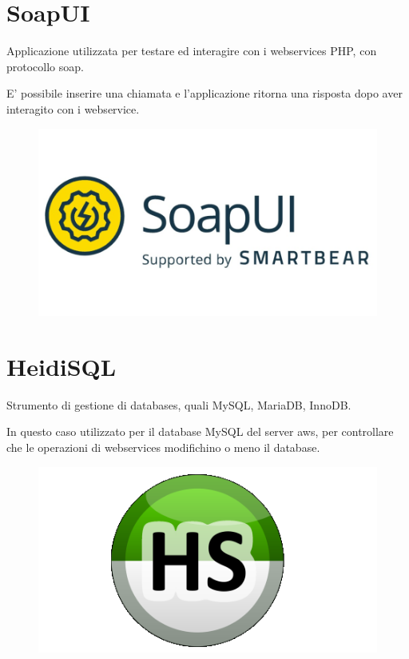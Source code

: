 \section{SoapUI}
\begin{flushleft}
	Applicazione utilizzata per testare ed interagire con i webservices PHP, con protocollo \gls{soap}.
	
	E' possibile inserire una chiamata e l'applicazione ritorna una risposta dopo aver interagito con i webservice.
	
\end{flushleft}
\begin{figure}[!h] 
	\centering
	\includegraphics[scale = 1]{immagini/tecnologie/soapui}
\end{figure}
\section{HeidiSQL}
\begin{flushleft}
	Strumento di gestione di databases, quali MySQL, MariaDB, InnoDB.
	
	In questo caso utilizzato per il database MySQL del server \gls{aws}, per controllare che le operazioni di webservices modifichino o meno il database.
\end{flushleft}
\begin{figure}[!h] 
	\centering
	\includegraphics[scale = 0.5]{immagini/tecnologie/HeidiSQL}
\end{figure}
